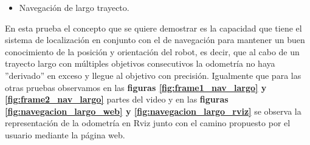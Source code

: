 \newpage
\begin{itemize}
  \item Navegación de largo trayecto.
\end{itemize}
En esta prueba el concepto que se quiere demostrar es la capacidad que tiene el sistema de localización en conjunto con el de navegación para mantener un 
buen conocimiento de la posición y orientación del robot, es decir, que al cabo de un trayecto largo con múltiples objetivos consecutivos la odometría no haya ''derivado'' en 
exceso y llegue al objetivo con precisión.
Igualmente que para las otras pruebas observamos en las \textbf{figuras \ref{fig:frame1_nav_largo} y \ref{fig:frame2_nav_largo}} partes del video y en las \textbf{figuras \ref{fig:navegacion_largo_web} y \ref{fig:navegacion_largo_rviz}} se observa 
la representación de la odometría en Rviz junto con el camino propuesto por el usuario mediante la página web.

